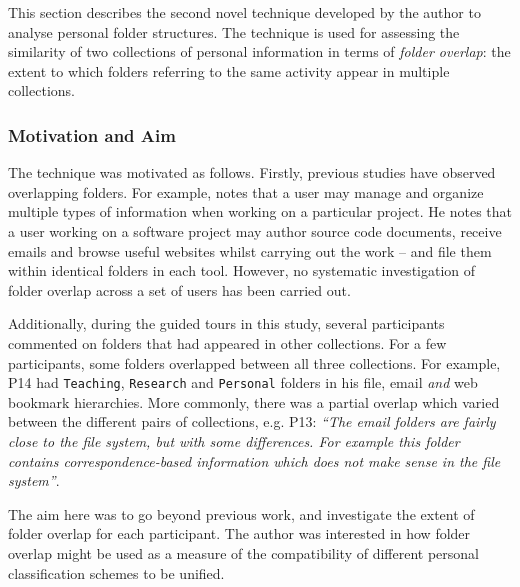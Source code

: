 This section describes the second novel technique developed by the author to analyse personal folder structures. The technique is used for assessing the similarity of two collections of personal information in terms of \textit{folder overlap}: the extent to which folders referring to the same activity appear in multiple collections. %

\subsubsection{Motivation and Aim}
The technique was motivated as follows. Firstly, previous studies have observed overlapping folders.  For example, \citet{Kaptelinin:03} notes that a user may manage and organize multiple types of information when working on a particular project.  He notes that a user working on a software project may author source code documents, receive emails and browse useful websites whilst carrying out the work -- and file them within identical folders in each tool. However, no systematic investigation of folder overlap across a set of users has been carried out.

Additionally, during the guided tours in this study, several participants commented on folders that had appeared in other collections. For a few participants, some folders overlapped between all three collections. For example, P14 had \texttt{Teaching}, \texttt{Research} and \texttt{Personal} folders in his file, email \textit{and} web bookmark hierarchies.  More commonly, there was a partial overlap which varied between the different pairs of collections, e.g. P13: \textit{``The email folders are fairly close to the file system, but with some differences. For example this folder contains correspondence-based information which does not make sense in the file system''}.  



The aim here was to go beyond previous work, and investigate the extent of folder overlap for each participant.  The author was interested in how folder overlap might be used as a measure of the compatibility of different personal classification schemes to be unified.  %


